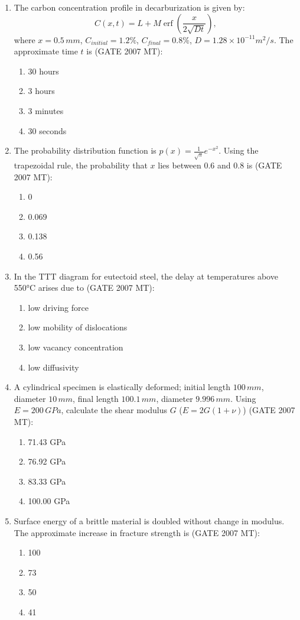 \documentclass[12pt]{article}
\begin{document}
\begin{enumerate}
\item The carbon concentration profile in decarburization is given by:
\[
C(x,t) = L + M \operatorname{erf}\left(\frac{x}{2\sqrt{Dt}}\right),
\]
where \(x=0.5\,mm\), \(C_{initial} = 1.2\%\), \(C_{final} = 0.8\%\), \(D = 1.28 \times 10^{-11} m^2/s\). The approximate time \(t\) is (GATE 2007 MT):
\begin{enumerate}
  \item 30 hours
  \item 3 hours
  \item 3 minutes
  \item 30 seconds
\end{enumerate}

\item The probability distribution function is \(p(x) = \frac{1}{\sqrt{\pi}} e^{-x^2}\). Using the trapezoidal rule, the probability that \(x\) lies between 0.6 and 0.8 is (GATE 2007 MT):
\begin{enumerate}
  \item 0
  \item 0.069
  \item 0.138
  \item 0.56
\end{enumerate}

\item In the TTT diagram for eutectoid steel, the delay at temperatures above 550°C arises due to (GATE 2007 MT):
\begin{enumerate}
  \item low driving force
  \item low mobility of dislocations
  \item low vacancy concentration
  \item low diffusivity
\end{enumerate}

\item A cylindrical specimen is elastically deformed; initial length \(100\,mm\), diameter \(10\,mm\), final length \(100.1\,mm\), diameter \(9.996\,mm\). Using \(E=200\,GPa\), calculate the shear modulus \(G\) (\(E=2G(1+\nu)\)) (GATE 2007 MT):
\begin{enumerate}
  \item 71.43 GPa
  \item 76.92 GPa
  \item 83.33 GPa
  \item 100.00 GPa
\end{enumerate}

\item Surface energy of a brittle material is doubled without change in modulus. The approximate increase in fracture strength is (GATE 2007 MT):
\begin{enumerate}
  \item 100%
  \item 73%
  \item 50%
  \item 41%
\end{enumerate}


\end{enumerate}
\end{document}
